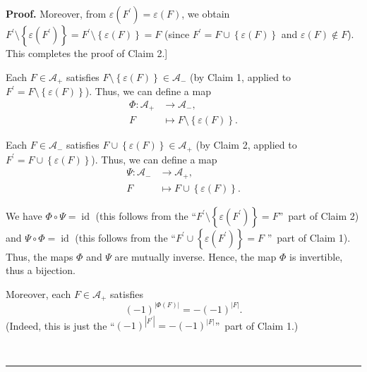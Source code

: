 \documentclass[numbers=enddot,12pt,final,onecolumn]{scrartcl}%
\theoremstyle{definition}
\newenvironment{proof}[1][Proof]{\noindent\textbf{#1.} }{\ \rule{0.5em}{0.5em}}
\newenvironment{vershort}{}{}
\begin{document}
\begin{vershort}
\begin{proof}
Moreover, from $\varepsilon\left(  F^{\prime}\right)  =\varepsilon\left(
F\right)  $, we obtain $F^{\prime}\setminus\left\{  \varepsilon\left(
F^{\prime}\right)  \right\}  =F^{\prime}\setminus\left\{  \varepsilon\left(
F\right)  \right\}  =F$ (since $F^{\prime}=F\cup\left\{  \varepsilon\left(
F\right)  \right\}  $ and $\varepsilon\left(  F\right)  \notin F$). This
completes the proof of Claim 2.]

Each $F\in\mathcal{A}_{+}$ satisfies $F\setminus\left\{  \varepsilon\left(
F\right)  \right\}  \in\mathcal{A}_{-}$ (by Claim 1, applied to $F^{\prime
}=F\setminus\left\{  \varepsilon\left(  F\right)  \right\}  $). Thus, we can
define a map%
\begin{align*}
\Phi:\mathcal{A}_{+}  &  \rightarrow\mathcal{A}_{-},\\
F  &  \mapsto F\setminus\left\{  \varepsilon\left(  F\right)  \right\}  .
\end{align*}


Each $F\in\mathcal{A}_{-}$ satisfies $F\cup\left\{  \varepsilon\left(
F\right)  \right\}  \in\mathcal{A}_{+}$ (by Claim 2, applied to $F^{\prime
}=F\cup\left\{  \varepsilon\left(  F\right)  \right\}  $). Thus, we can define
a map%
\begin{align*}
\Psi:\mathcal{A}_{-}  &  \rightarrow\mathcal{A}_{+},\\
F  &  \mapsto F\cup\left\{  \varepsilon\left(  F\right)  \right\}  .
\end{align*}


We have $\Phi\circ\Psi=\operatorname*{id}$ (this follows from the
\textquotedblleft$F^{\prime}\setminus\left\{  \varepsilon\left(  F^{\prime
}\right)  \right\}  =F$\textquotedblright\ part of Claim 2) and $\Psi\circ
\Phi=\operatorname*{id}$ (this follows from the \textquotedblleft$F^{\prime
}\cup\left\{  \varepsilon\left(  F^{\prime}\right)  \right\}  =F$%
\textquotedblright\ part of Claim 1). Thus, the maps $\Phi$ and $\Psi$ are
mutually inverse. Hence, the map $\Phi$ is invertible, thus a bijection.

Moreover, each $F\in\mathcal{A}_{+}$ satisfies%
\begin{equation}
\left(  -1\right)  ^{\left\vert \Phi\left(  F\right)  \right\vert }=-\left(
-1\right)  ^{\left\vert F\right\vert }.
\label{pf.thm.elser-Shade0.short.signrev}%
\end{equation}
(Indeed, this is just the \textquotedblleft$\left(  -1\right)  ^{\left\vert
F^{\prime}\right\vert }=-\left(  -1\right)  ^{\left\vert F\right\vert }%
$\textquotedblright\ part of Claim 1.)


\end{proof}
\end{vershort}
\end{document}

